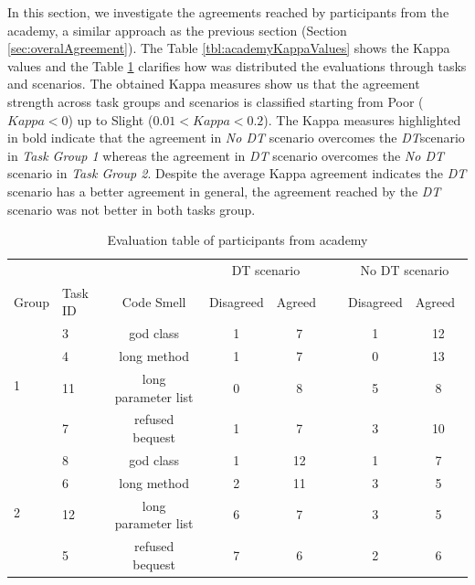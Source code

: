 In this section, we investigate the agreements reached by participants from the academy, a similar approach as the previous section (Section \ref{sec:overalAgreement}). The Table \ref{tbl:academyKappaValues} shows the Kappa values and the Table \ref{tbl:academyTableEvaluation} clarifies how was distributed the evaluations through tasks and scenarios. The obtained Kappa measures show us that the agreement strength across task groups and scenarios is classified starting from Poor ($Kappa < 0$) up to Slight ($0.01 < Kappa < 0.2$). The Kappa measures highlighted in bold indicate that the agreement in \textit{No DT} scenario overcomes the \textit{DT}scenario in \textit{Task Group 1} whereas the agreement in \textit{DT} scenario overcomes the \textit{No DT} scenario in \textit{Task Group 2}. Despite the average Kappa agreement indicates the \textit{DT} scenario has a better agreement in general, the agreement reached by the \textit{DT} scenario was not better in both tasks group.

\begin{table}[ht]
\centering
\begin{tabular}{llccclcc} 
\toprule
 &  & \multicolumn{1}{l}{} & \multicolumn{2}{c}{DT scenario} & \multicolumn{1}{c}{} & \multicolumn{2}{c}{No DT scenario} \\ 
\cmidrule{4-5}\cmidrule{7-8}
Group & Task ID & Code Smell & Disagreed & Agreed~ &  & \multicolumn{1}{l}{Disagreed} & \multicolumn{1}{l}{Agreed~} \\ 
\midrule
\multirow{4}{*}{1} & 3 & god class & 1 & 7 &  & 1 & 12 \\
 & 4 & long method & 1 & 7 &  & 0 & 13 \\
 & 11 & long parameter list & 0 & 8 &  & 5 & 8 \\
 & 7 & refused bequest & 1 & 7 &  & 3 & 10 \\ 
\midrule
\multirow{4}{*}{2} & 8 & god class & 1 & 12 &  & 1 & 7 \\
 & 6 & long method & 2 & 11 &  & 3 & 5 \\
 & 12 & long parameter list & 6 & 7 &  & 3 & 5 \\
 & 5 & refused bequest & 7 & 6 &  & 2 & 6 \\
\bottomrule
\end{tabular}
\caption{Evaluation table of participants from academy}
\label{tbl:academyTableEvaluation}
\end{table}

